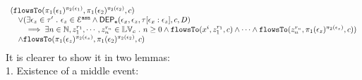 %
$$
\begin{array}{l}
(\flowsto(\pi_1(\event_1)^{\pi_2(\event_1)}, \pi_1(\event_2)^{\pi_2(\event_2)}, c)
\\ \quad 
\lor 
(\exists \event_z \in \trace' \st \event_z \in \eventset^{\asn} \land 
    \eventdep(\event_x, \event_z, \trace[\event_x: \event_z], c, D)
    \\ \qquad 
    \implies 
    \exists n \in \mathbb{N}, z_1^{r_1}, \cdots, z_n^{r_n} \in \lvar_{{c}} \st n \geq 0 \land
\flowsto(x^i,  z_1^{r_1}, c) 
\land \cdots \land \flowsto(z_n^{r_n},  \pi_1(\event_z)^{\pi_2(\event_z)}, c)
    )
    \\ \quad
    \land 
    \flowsto(\pi_1(\event_z)^{\pi_2(\event_z)}, \pi_1(\event_2)^{\pi_2(\event_2)}, c) 
\end{array}
$$
%
It is clearer to show it in two lemmas:
\\
1. Existence of a middle event:
